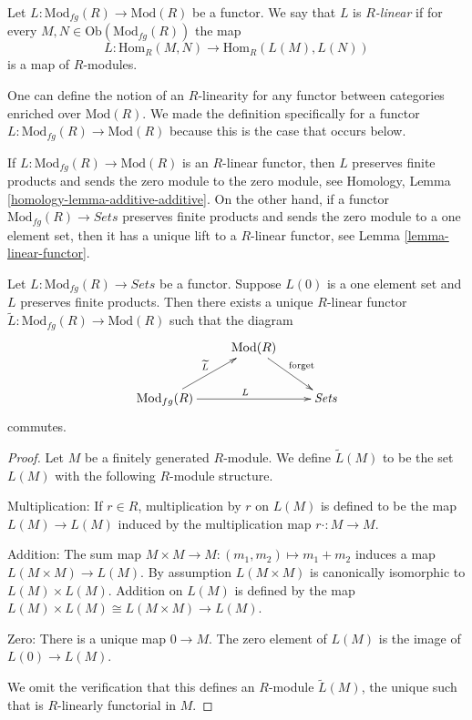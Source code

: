 \begin{definition}
\label{definition-linear}
Let $L: \text{Mod}_{fg}(R) \to \text{Mod}(R)$ be a 
functor.  We say that $L$ is {\it $R$-linear} if for every $M,N \in 
\text{Ob}(\text{Mod}_{fg}(R))$ the map
$$
L : \text{Hom}_{R}(M,N) \longrightarrow \text{Hom}_{R}(L(M),L(N))
$$
is a map of $R$-modules.
\end{definition}

\begin{remark}
\label{remark-linear-enriched-over-modules}
One can define the notion of an $R$-linearity for any functor between 
categories enriched over $\text{Mod}(R)$. We made the definition 
specifically for a functor $L: \text{Mod}_{fg}(R) \to 
\text{Mod}(R)$ because this is the case that occurs below.
\end{remark}

\begin{remark}
\label{remark-linear-functor}
If $L: \text{Mod}_{fg}(R) \to \text{Mod}(R)$ is an $R$-linear functor,
then $L$ preserves finite products and sends the zero module to the zero
module, see
Homology, Lemma \ref{homology-lemma-additive-additive}.
On the other hand, if a functor $\text{Mod}_{fg}(R) \to \textit{Sets}$ 
preserves finite products and sends the zero module to a one element set,
then it has a unique lift to a $R$-linear functor, see
Lemma \ref{lemma-linear-functor}.
\end{remark}

\begin{lemma}
\label{lemma-linear-functor}
Let $L: \text{Mod}_{fg}(R) \to \textit{Sets}$ be a 
functor.  Suppose $L(0)$ is a one element set and $L$ preserves finite 
products.  Then there exists a unique $R$-linear functor
$\widetilde{L} : \text{Mod}_{fg}(R) \to \text{Mod}(R)$ such that the 
diagram
$$
\xymatrix{
& \text{Mod}(R) \ar[dr]^{\text{forget}} &   \\
\text{Mod}_{fg}(R)  \ar[ur]^{\widetilde{L}} \ar[rr]^{L} &  & 
\textit{Sets}
}
$$
commutes.
\end{lemma}

\begin{proof}
Let $M$ be a finitely generated $R$-module. We define $\widetilde{L}(M)$ to be
the set $L(M)$ with the following $R$-module structure.

\medskip\noindent
Multiplication: If $r \in R$, multiplication by $r$ on $L(M)$ is defined to be
the map $L(M) \to L(M)$ induced by the multiplication map
$r \cdot: M \to M$.

\medskip\noindent
Addition: The sum map $M \times M \to M: (m_1,m_2) \mapsto m_1 + m_2$ 
induces a map $L(M \times M) \to L(M)$. By assumption $L(M \times M)$ 
is canonically isomorphic to $L(M) \times L(M)$.  Addition on $L(M)$ is defined 
by the map $L(M) \times L(M) \cong L(M \times M) \to L(M)$.

\medskip\noindent
Zero: There is a unique map $0 \to M$. The zero element of $L(M)$ is
the image of $L(0) \to L(M)$.

\medskip\noindent
We omit the verification that this defines an $R$-module $\widetilde{L}(M)$,
the unique such that is $R$-linearly functorial in $M$.
\end{proof}

